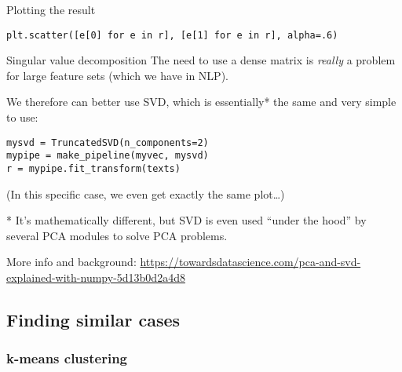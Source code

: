 \begin{frame}{Plotting the result}
\begin{lstlisting}
plt.scatter([e[0] for e in r], [e[1] for e in r], alpha=.6)
\end{lstlisting}



\end{frame}



\begin{frame}[fragile]{Singular value decomposition}
The need to use a dense matrix is \emph{really} a problem for large feature sets (which we have in NLP).
\pause

We therefore can better use SVD, which is essentially* the same and very simple to use:

\begin{lstlisting}
mysvd = TruncatedSVD(n_components=2)
mypipe = make_pipeline(myvec, mysvd)
r = mypipe.fit_transform(texts)
\end{lstlisting}

\footnotesize{(In this specific case, we even get exactly the same plot\ldots)}


\footnotesize{
* It's mathematically different, but SVD is even used ``under the hood'' by several PCA modules to solve PCA problems.

More info and background: \url{https://towardsdatascience.com/pca-and-svd-explained-with-numpy-5d13b0d2a4d8}}

\end{frame}







\subsection{Finding similar cases}

\subsubsection{k-means clustering}




